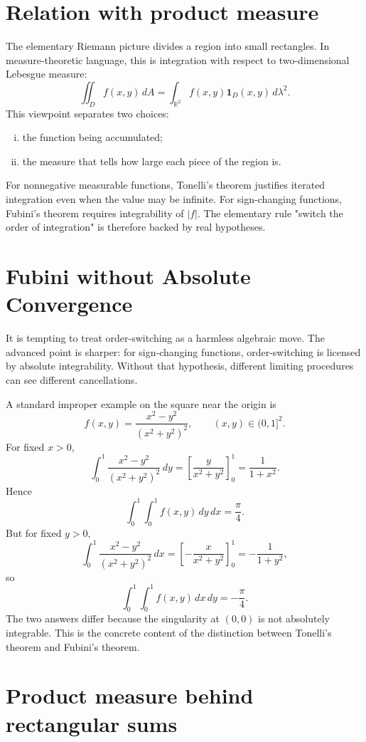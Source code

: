 \section{Relation with product measure}

The elementary Riemann picture divides a region into small rectangles.  In measure-theoretic language, this is integration with respect to two-dimensional Lebesgue measure:
\[
  \iint_D f(x,y)\,dA
  =\int_{\mathbb R^2} f(x,y)\mathbf 1_D(x,y)\,d\lambda^2.
\]
This viewpoint separates two choices:
\begin{enumerate}[(i)]
  \item the function being accumulated;
  \item the measure that tells how large each piece of the region is.
\end{enumerate}

For nonnegative measurable functions, Tonelli's theorem justifies iterated integration even when the value may be infinite.  For sign-changing functions, Fubini's theorem requires integrability of \(|f|\).  The elementary rule "switch the order of integration" is therefore backed by real hypotheses.

\section{Fubini without Absolute Convergence}

It is tempting to treat order-switching as a harmless algebraic move.  The advanced point is sharper: for sign-changing functions, order-switching is licensed by absolute integrability.  Without that hypothesis, different limiting procedures can see different cancellations.

A standard improper example on the square near the origin is
\[
  f(x,y)=\frac{x^2-y^2}{(x^2+y^2)^2},\qquad (x,y)\in(0,1]^2.
\]
For fixed \(x>0\),
\[
  \int_0^1 \frac{x^2-y^2}{(x^2+y^2)^2}\,dy
  =\left[\frac{y}{x^2+y^2}\right]_{0}^{1}
  =\frac{1}{1+x^2}.
\]
Hence
\[
  \int_0^1\int_0^1 f(x,y)\,dy\,dx=\frac{\pi}{4}.
\]
But for fixed \(y>0\),
\[
  \int_0^1 \frac{x^2-y^2}{(x^2+y^2)^2}\,dx
  =\left[-\frac{x}{x^2+y^2}\right]_{0}^{1}
  =-\frac{1}{1+y^2},
\]
so
\[
  \int_0^1\int_0^1 f(x,y)\,dx\,dy=-\frac{\pi}{4}.
\]
The two answers differ because the singularity at \((0,0)\) is not absolutely integrable.  This is the concrete content of the distinction between Tonelli's theorem and Fubini's theorem.

\section{Product measure behind rectangular sums}

